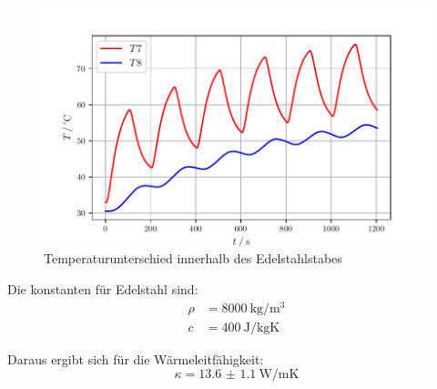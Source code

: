 \begin{figure}
    \centering
    \includegraphics[width=\textwidth]{data/T7T8.pdf}
    \caption{Temperaturunterschied innerhalb des Edelstahlstabes}
    \label{fig:t7t8}
\end{figure}

Die konstanten für Edelstahl sind:
\begin{align*}
    \rho& = 8000\:\si{\kilo\gram\per\meter\cubed} \\
    c& = 400\:\si{\joule\per\kilo\gram\kelvin}
\end{align*}

Daraus ergibt sich für die Wärmeleitfähigkeit:
\begin{equation*}
    \kappa = \SI{13.6(11)}{\watt\per\meter\kelvin}
\end{equation*}
